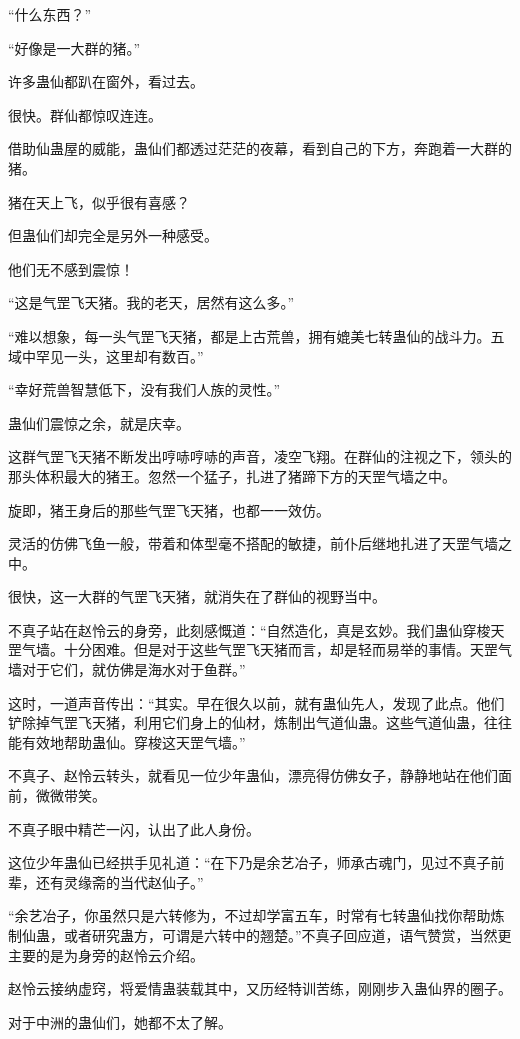 \begin{this_body}
“什么东西？”

“好像是一大群的猪。”

许多蛊仙都趴在窗外，看过去。

很快。群仙都惊叹连连。

借助仙蛊屋的威能，蛊仙们都透过茫茫的夜幕，看到自己的下方，奔跑着一大群的猪。

猪在天上飞，似乎很有喜感？

但蛊仙们却完全是另外一种感受。

他们无不感到震惊！

“这是气罡飞天猪。我的老天，居然有这么多。”

“难以想象，每一头气罡飞天猪，都是上古荒兽，拥有媲美七转蛊仙的战斗力。五域中罕见一头，这里却有数百。”

“幸好荒兽智慧低下，没有我们人族的灵性。”

蛊仙们震惊之余，就是庆幸。

这群气罡飞天猪不断发出哼哧哼哧的声音，凌空飞翔。在群仙的注视之下，领头的那头体积最大的猪王。忽然一个猛子，扎进了猪蹄下方的天罡气墙之中。

旋即，猪王身后的那些气罡飞天猪，也都一一效仿。

灵活的仿佛飞鱼一般，带着和体型毫不搭配的敏捷，前仆后继地扎进了天罡气墙之中。

很快，这一大群的气罡飞天猪，就消失在了群仙的视野当中。

不真子站在赵怜云的身旁，此刻感慨道：“自然造化，真是玄妙。我们蛊仙穿梭天罡气墙。十分困难。但是对于这些气罡飞天猪而言，却是轻而易举的事情。天罡气墙对于它们，就仿佛是海水对于鱼群。”

这时，一道声音传出：“其实。早在很久以前，就有蛊仙先人，发现了此点。他们铲除掉气罡飞天猪，利用它们身上的仙材，炼制出气道仙蛊。这些气道仙蛊，往往能有效地帮助蛊仙。穿梭这天罡气墙。”

不真子、赵怜云转头，就看见一位少年蛊仙，漂亮得仿佛女子，静静地站在他们面前，微微带笑。

不真子眼中精芒一闪，认出了此人身份。

这位少年蛊仙已经拱手见礼道：“在下乃是余艺冶子，师承古魂门，见过不真子前辈，还有灵缘斋的当代赵仙子。”

“余艺冶子，你虽然只是六转修为，不过却学富五车，时常有七转蛊仙找你帮助炼制仙蛊，或者研究蛊方，可谓是六转中的翘楚。”不真子回应道，语气赞赏，当然更主要的是为身旁的赵怜云介绍。

赵怜云接纳虚窍，将爱情蛊装载其中，又历经特训苦练，刚刚步入蛊仙界的圈子。

对于中洲的蛊仙们，她都不太了解。


\end{this_body}
